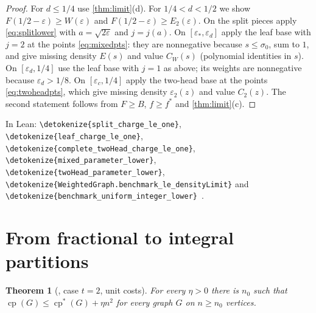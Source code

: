 \documentclass[10pt]{article}
\newtheorem{theorem}{Theorem}[section]
\newtheorem{proposition}[theorem]{Proposition}
\theoremstyle{definition}
\theoremstyle{remark}
\numberwithin{equation}{section}
\newcommand{\cp}{\operatorname{cp}}
\newcommand{\cps}{\operatorname{cp}^{*}}
\newcommand{\eps}{\varepsilon}
\newcommand{\leanid}[1]{\expandafter\nolinkurl\expandafter{\detokenize{#1}}}
\newcommand{\Fm}[1]{\cite[#1]{Formalization}}
\begin{document}

\begin{proof}
For $d\le1/4$ use \cref{thm:limit}(d). For $1/4<d<1/2$ we show $F(1/2-\eps)\ge W(\eps)$ and $F(1/2-\eps)\ge E_2(\eps)$. On the split pieces apply \eqref{eq:splitlower} with $a=\sqrt{2\eps}$ and $j=j(a)$. On $[\eps_*,\eps_d]$ apply the leaf base with $j=2$ at the points \eqref{eq:mixedpts}: they are nonnegative because $s\le\sigma_0$, sum to $1$, and give missing density $E(s)$ and value $C_W(s)$ (polynomial identities in $s$). On $[\eps_d,1/4]$ use the leaf base with $j=1$ as above; its weights are nonnegative because $\eps_d>1/8$. On $[\eps_c,1/4]$ apply the two-head base at the points \eqref{eq:twoheadpts}, which give missing density $\eps_2(z)$ and value $C_2(z)$. The second statement follows from $F\ge B$, $f\ge f^*$ and \cref{thm:limit}(c).
\end{proof}

In Lean: \leanid{split_charge_le_one}, \leanid{leaf_charge_le_one}, \leanid{complete_twoHead_charge_le_one}, \leanid{mixed_parameter_lower}, \leanid{twoHead_parameter_lower}, \leanid{WeightedGraph.benchmark_le_densityLimit} and \leanid{benchmark_uniform_integer_lower}~\Fm{\S4}.

\section{From fractional to integral partitions}\label{sec:transfer}

\begin{theorem}[{\cite[Theorem~1.10]{BHKNW26}, case $t=2$, unit costs}]\label{thm:transfer}
For every $\eta>0$ there is $n_0$ such that $\cp(G)\le\cps(G)+\eta n^2$ for every graph $G$ on $n\ge n_0$ vertices.
\end{theorem}
\end{document}
